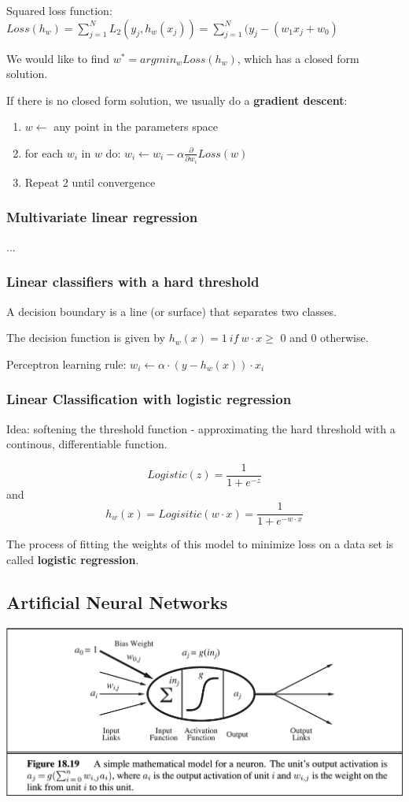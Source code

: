 \documentclass{scrartcl}
\begin{document}
Squared loss function: \(Loss(h_w) = \sum_{j=1}^N L_2(y_j, h_w(x_j)) = \sum_{j=1}^N (y_j - (w_1x_j + w_0)\)

We would like to find \(w^* = argmin_w Loss(h_w)\), which has a closed form solution.

\bigbreak

If there is no closed form solution, we usually do a \textbf{gradient descent}:
\begin{enumerate}
    \item
        \(w \leftarrow\) any point in the parameters space
    \item
        for each \(w_i\) in \(w\) do: \(w_i \leftarrow w_i - \alpha \frac{\partial}{\partial w_i} Loss(w)\)
    \item
        Repeat 2 until convergence
\end{enumerate}

\subsubsection{Multivariate linear regression}
...

\subsubsection{Linear classifiers with a hard threshold}
A decision boundary is a line (or surface) that separates two classes. 

The decision function is given by \(h_w(x) = 1 \ if \ w\cdot x \geq\) 0 and 0 otherwise.

Perceptron learning rule: \(w_i \leftarrow \alpha \cdot (y - h_w(x)) \cdot x_i\)

\subsubsection{Linear Classification with logistic regression}
Idea: softening the threshold function - approximating the hard threshold with a continous, differentiable function.

\[Logistic(z) = \frac{1}{1+e^{-z}}\]
and
\[h_w(x) = Logisitic(w \cdot x) = \frac{1}{1+e^{-w\cdot x}}\]

The process of fitting the weights of this model to minimize loss on a data set is called \textbf{logistic regression}. 

\subsection{Artificial Neural Networks}
\begin{center}
    \includegraphics[scale=0.4]{img/neuron.png}
\end{center}
\end{document}
